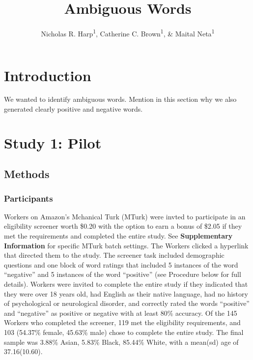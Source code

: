 \documentclass[man]{apa6}
\title{Ambiguous Words}
\author{Nicholas R. Harp\textsuperscript{1}, Catherine C. Brown\textsuperscript{1}, \& Maital Neta\textsuperscript{1}}
\date{}
\affiliation{
\vspace{0.5cm}
\textsuperscript{1} University of Nebraska-Lincoln}
\begin{document}
\maketitle

\hypertarget{introduction}{%
\section{Introduction}\label{introduction}}

We wanted to identify ambiguous words. Mention in this section why we also generated clearly positive and negative words.

\hypertarget{study-1-pilot}{%
\section{Study 1: Pilot}\label{study-1-pilot}}

\hypertarget{methods}{%
\subsection{Methods}\label{methods}}

\hypertarget{participants}{%
\subsubsection{Participants}\label{participants}}

Workers on Amazon's Mchanical Turk (MTurk) were invted to participate in an eligibility screener worth \$0.20 with the option to earn a bonus of \$2.05 if they met the requirements and completed the entire study. See \textbf{Supplementary Information} for specific MTurk batch settings. The Workers clicked a hyperlink that directed them to the study. The screener task included demographic questions and one block of word ratings that included 5 instances of the word \enquote{negative} and 5 instances of the word \enquote{positive} (see Procedure below for full details). Workers were invited to complete the entire study if they indicated that they were over 18 years old, had English as their native language, had no history of psychological or neurological disorder, and correctly rated the words \enquote{positive} and \enquote{negative} as positive or negative with at least 80\% accuracy. Of the 145 Workers who completed the screener, 119 met the eligibility requirements, and 103 (54.37\% female, 45.63\% male) chose to complete the entire study. The final sample was 3.88\% Asian, 5.83\% Black, 85.44\% White, with a mean(sd) age of 37.16(10.60).
\end{document}
